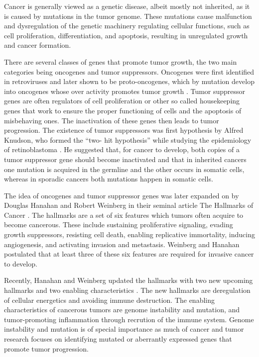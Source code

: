 Cancer is generally viewed as a genetic disease, albeit mostly not inherited,
as it is caused by  mutations in the tumor genome. These mutations cause
malfunction and dysregulation of the genetic machinery regulating cellular
functions, such as cell proliferation, differentiation, and apoptosis,
resulting in unregulated growth and cancer formation.

There are several classes of genes that promote tumor growth, the two main
categories being oncogenes and tumor suppressors. Oncogenes were first
identified in retroviruses and later shown to be proto-oncogenes, which by
mutation develop into oncogenes whose over activity promotes tumor growth
\citep{Varmus1988}. Tumor suppressor genes are often regulators of cell
proliferation or other so called housekeeping genes that work to ensure the
proper functioning of cells and the apoptosis of misbehaving ones. The
inactivation of these genes then leads to tumor progression. The existence of
tumor suppressors was first hypothesis by Alfred Knudson, who formed the “two-
hit hypothesis” while studying the epidemiology of retinoblastoma
\citep{Knudson1971}. He suggested that, for cancer to develop, both copies of
a tumor suppressor gene should become inactivated and that in inherited
cancers one mutation is acquired in the germline and the other occurs in
somatic cells, whereas in sporadic cancers both mutations happen in somatic
cells.

The idea of oncogenes and tumor suppressor genes was later expanded on by
Douglas Hanahan and Robert Weinberg in their seminal article The Hallmarks of
Cancer \citep{Hanahan2000}. The hallmarks are a set of six features which
tumors often acquire to become cancerous. These include sustaining
proliferative signaling, evading growth suppressors, resisting cell death,
enabling replicative immortality, inducing angiogenesis, and activating
invasion and metastasis. Weinberg and Hanahan postulated that at least three
of these six features are required for invasive cancer to develop.

Recently, Hanahan and Weinberg updated the hallmarks with two new upcoming
hallmarks and two enabling characteristics \citep{Hanahan2011}. The new
hallmarks are deregulation of cellular energetics and avoiding immune
destruction. The enabling characteristics of cancerous tumors are genome
instability and mutation, and tumor-promoting inflammation through recrution
of the immune system. Genome instability and mutation is of special importance
as much of cancer and tumor research focuses  on identifying mutated or
aberrantly expressed genes that promote tumor progression.



